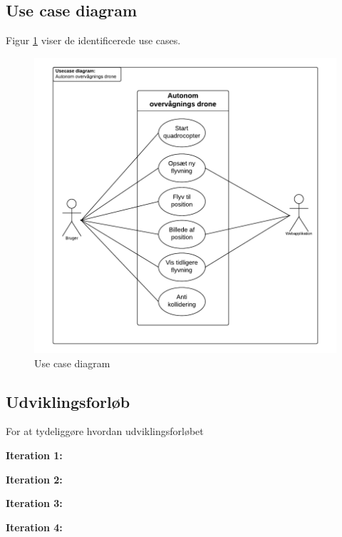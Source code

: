\newpage 

\subsection{Use case diagram}
\label{subsec:useCaseDiagram}
Figur \ref{fig:UCD} viser de identificerede use cases.
\vspace{-10pt}
\begin{figure}[H]
\includegraphics[width=1\textwidth]{Billeder/Use_case_diagram.png}
\vspace{-30pt}
\caption{Use case diagram}
\label{fig:UCD}
\end{figure}



\subsection{Udviklingsforløb}

For at tydeliggøre hvordan udviklingsforløbet  

\textbf{Iteration 1:}


\textbf{Iteration 2:}

\textbf{Iteration 3:}

\textbf{Iteration 4:}